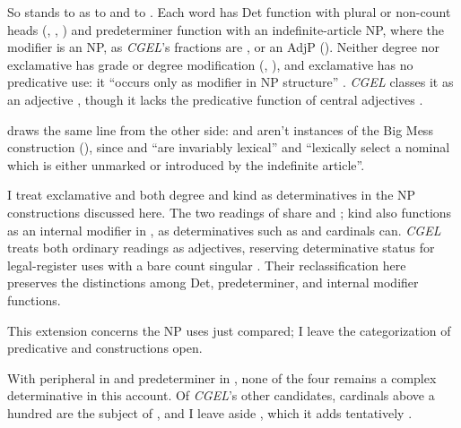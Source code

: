 \documentclass[12pt]{article}
\begin{document}
So  stands to  as  to  and  to . Each word has Det function with plural or non-count heads (, , ) and predeterminer function with an indefinite-article NP, where the modifier is an NP, as \textit{CGEL}'s fractions are \citep[385 n.~25]{huddleston2002}, or an AdjP (). Neither degree  nor exclamative  has grade or degree modification (, ), and exclamative  has no predicative use: it \enquote{occurs only as modifier in NP structure} \citep[920]{huddleston2002}. \textit{CGEL} classes it as an adjective \citep[540]{huddleston2002}, though it lacks the predicative function of central adjectives \citep[528]{huddleston2002}.

\textcite[§5]{VanEynde_2007_BigMess} draws the same line from the other side:  and  aren't instances of the Big Mess construction (), since  and  \enquote{are invariably lexical} and \enquote{lexically select a nominal which is either unmarked or introduced by the indefinite article}.

I treat exclamative  and both degree and kind  as determinatives in the NP constructions discussed here. The two readings of  share  and ; kind  also functions as an internal modifier in , as determinatives such as  and cardinals can. \textit{CGEL} treats both ordinary readings as adjectives, reserving determinative status for legal-register uses with a bare count singular \citep[435 and n.~52]{huddleston2002}. Their reclassification here preserves the distinctions among Det, predeterminer, and internal modifier functions.

This extension concerns the NP uses just compared; I leave the categorization of predicative  and  constructions open.

With peripheral  in  and predeterminer  in , none of the four remains a complex determinative in this account. Of \textit{CGEL}'s other candidates, cardinals above a hundred are the subject of \textcite{reynolds2026numerals}, and I leave aside , which it adds tentatively \citep[393]{huddleston2002}.
\end{document}
